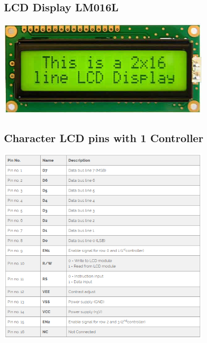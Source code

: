 \subsection{LCD Display LM016L}
\centerline{
	\includegraphics[width=0.8\textwidth]{overview/images/lcd.jpg}
}


\subsection{Character LCD pins with 1 Controller}
\centerline{
	\includegraphics[width=0.8\textwidth]{overview/images/character.png}
}



